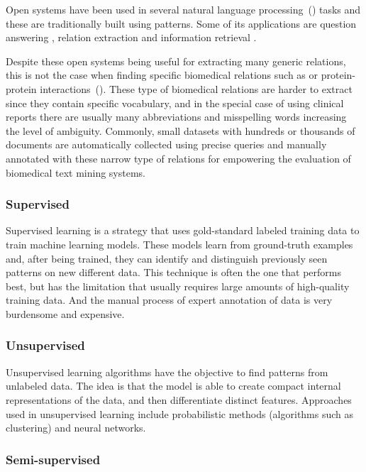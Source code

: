 Open  systems have been used in several natural language processing~() tasks and these are traditionally built using patterns.
Some of its applications are question answering \parencite{fader2014a}, relation extraction \parencite{soderland2010a,fader2011a} and information retrieval \parencite{etzioni2011a}.

Despite these open  systems being useful for extracting many generic relations, this is not the case when finding specific biomedical relations such as  or protein-protein interactions~().
These type of biomedical relations are harder to extract since they contain specific vocabulary, and in the special case of using clinical reports there are usually many abbreviations and misspelling words increasing the level of ambiguity.
Commonly, small datasets with hundreds or thousands of documents are automatically collected using precise queries and manually annotated with these narrow type of relations for empowering the evaluation of biomedical text mining systems.


\subsubsection{Supervised}

Supervised learning is a strategy that uses gold-standard labeled training data to train machine learning models.
These models learn from ground-truth examples and, after being trained, they can identify and distinguish previously seen patterns on new different data.
This technique is often the one that performs best, but has the limitation that usually requires large amounts of high-quality training data.
And the manual process of expert annotation of data is very burdensome and expensive.


\subsubsection{Unsupervised}

Unsupervised learning algorithms have the objective to find patterns from unlabeled data.
The idea is that the model is able to create compact internal representations of the data, and then differentiate distinct features.
Approaches used in unsupervised learning include probabilistic methods (algorithms such as clustering) and neural networks.


\subsubsection{Semi-supervised}

